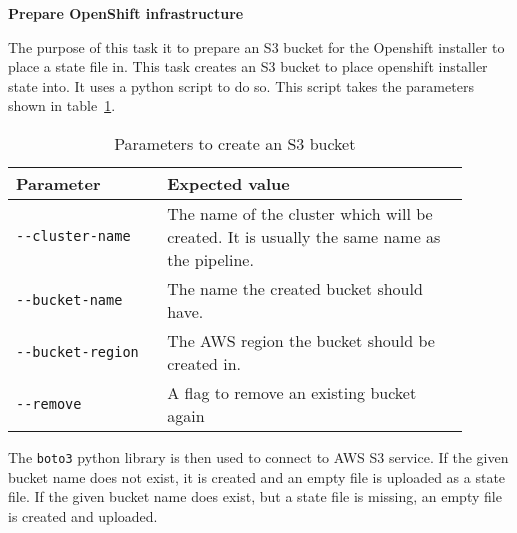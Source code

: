 \textbf{Prepare OpenShift infrastructure}

The purpose of this task it to prepare an S3 bucket for the Openshift installer to place a state file in.
This task creates an S3 bucket to place openshift installer state into.
It uses a python script to do so.
This script takes the parameters shown in table~\ref{tab:parameters-to-create-an-s3-bucket}.

\begin{table}[H]
    \centering
    \caption{Parameters to create an S3 bucket}
    \label{tab:parameters-to-create-an-s3-bucket}
    \begin{tabular}{p{0.3\linewidth}|p{0.6\linewidth}}
        Parameter & Expected value \\
        \hline
        \verb|--cluster-name| & The name of the cluster which will be created.
            It is usually the same name as the pipeline. \\
        \verb|--bucket-name| & The name the created bucket should have. \\
        \verb|--bucket-region| & The AWS region the bucket should be created in. \\
        \verb|--remove| & A flag to remove an existing bucket again \\
    \end{tabular}
\end{table}

The \verb|boto3| python library is then used to connect to AWS S3 service.
If the given bucket name does not exist, it is created and an empty file is uploaded as a state file.
If the given bucket name does exist, but a state file is missing, an empty file is created and uploaded.
